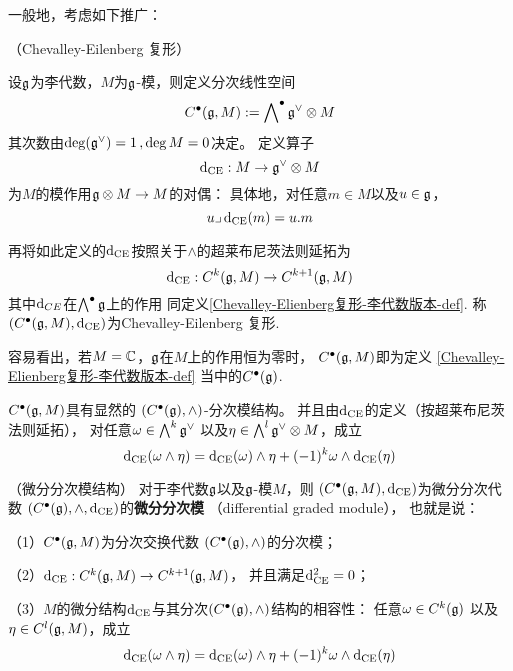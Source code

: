 一般地，考虑如下推广：

\begin{definition}（Chevalley-Eilenberg 复形）

设$\mathfrak{g}$为李代数，$M$为$\mathfrak{g}$-模，则定义分次线性空间
$$C^{\bullet}(\mathfrak{g},M):=\bigwedge\nolimits^{\bullet}\mathfrak{g}^\vee\otimes M$$
其次数由$\deg(\mathfrak{g}^\vee)=1\,,\deg M=0$决定。
定义算子
$$\mathrm{d}_{\operatorname{CE}}: M\to \mathfrak{g}^\vee\otimes M$$
为$M$的模作用$\mathfrak{g}\otimes M\to M$的对偶：
具体地，对任意$m\in M$以及$u\in\mathfrak{g}$，
$$u\lrcorner\,\mathrm{d}_{\operatorname{CE}}(m)=u.m$$

再将如此定义的$\mathrm{d}_{\operatorname{CE}}$按照关于$\wedge$的超莱布尼茨法则延拓为
$$\mathrm{d}_{\operatorname{CE}}:C^k(\mathfrak{g},M)\to C^{k+1}(\mathfrak{g},M)$$
其中$\mathrm{d}_{CE}$在$\bigwedge\nolimits^{\bullet}\mathfrak{g}$上的作用
同定义\ref{Chevalley-Elienberg复形-李代数版本-def}.
称$(C^{\bullet}(\mathfrak{g},M),\mathrm{d}_{\operatorname{CE}})$为Chevalley-Eilenberg 复形.
\end{definition}

容易看出，若$M=\mathbb{C}$，$\mathfrak{g}$在$M$上的作用恒为零时，
$C^{\bullet}(\mathfrak{g},M)$即为定义
\ref{Chevalley-Elienberg复形-李代数版本-def}
当中的$C^{\bullet}(\mathfrak{g})$.

$C^{\bullet}(\mathfrak{g},M)$具有显然的
$(C^{\bullet}(\mathfrak{g}),\wedge)$-分次模结构。
并且由$\mathrm{d}_{\operatorname{CE}}$的定义（按超莱布尼茨法则延拓），
对任意$\omega\in\bigwedge\nolimits^{k}\mathfrak{g}^\vee$
以及$\eta\in\bigwedge\nolimits^{l}\mathfrak{g}^\vee\otimes M$，成立
$$
  \mathrm{d}_{\operatorname{CE}}(\omega\wedge\eta)
= \mathrm{d}_{\operatorname{CE}}(\omega)\wedge\eta
 +(-1)^{k}\omega\wedge\mathrm{d}_{\operatorname{CE}}(\eta)
$$


\begin{prop}（微分分次模结构）
对于李代数$\mathfrak{g}$以及$\mathfrak{g}$-模$M$，则
$(C^{\bullet}(\mathfrak{g},M),\mathrm{d}_{\operatorname{CE}})$为微分分次代数
$(C^{\bullet}(\mathfrak{g}),\wedge,\mathrm{d}_{\operatorname{CE}})$的\textbf{微分分次模}
（differential graded module），
\label{微分分次模的定义-prop}
也就是说：\vs

（1）$C^{\bullet}(\mathfrak{g},M)$为分次交换代数
$(C^{\bullet}(\mathfrak{g}),\wedge)$的分次模；\vs

（2）$\mathrm{d}_{\operatorname{CE}}:C^k(\mathfrak{g},M)\to C^{k+1}(\mathfrak{g},M)$，
并且满足$\mathrm{d}_{\operatorname{CE}}^2=0$；\vs

（3）$M$的微分结构$\mathrm{d}_{\operatorname{CE}}$与其分次$(C^{\bullet}(\mathfrak{g}),\wedge)$结构的相容性：
任意$\omega\in C^k(\mathfrak{g})$
以及$\eta\in C^l(\mathfrak{g},M)$，成立
$$
  \mathrm{d}_{\operatorname{CE}}(\omega\wedge\eta)
= \mathrm{d}_{\operatorname{CE}}(\omega)\wedge\eta
 +(-1)^{k}\omega\wedge\mathrm{d}_{\operatorname{CE}}(\eta)
$$
\end{prop}

